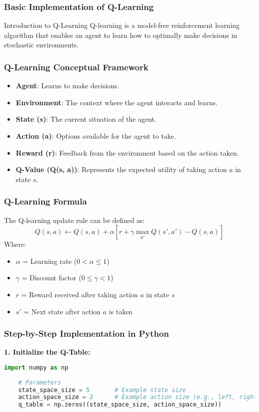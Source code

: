 \documentclass[aspectratio=169]{beamer}
\begin{document}
\begin{frame}
    \frametitle{Basic Implementation of Q-Learning}
    \begin{block}{Introduction to Q-Learning}
        Q-learning is a model-free reinforcement learning algorithm that enables an agent to learn how to optimally make decisions in stochastic environments.
    \end{block}
\end{frame}

\begin{frame}
    \frametitle{Q-Learning Conceptual Framework}
    \begin{itemize}
        \item \textbf{Agent}: Learns to make decisions.
        \item \textbf{Environment}: The context where the agent interacts and learns.
        \item \textbf{State (s)}: The current situation of the agent.
        \item \textbf{Action (a)}: Options available for the agent to take.
        \item \textbf{Reward (r)}: Feedback from the environment based on the action taken.
        \item \textbf{Q-Value (Q(s, a))}: Represents the expected utility of taking action $a$ in state $s$.
    \end{itemize}
\end{frame}

\begin{frame}
    \frametitle{Q-Learning Formula}
    The Q-learning update rule can be defined as:
    \begin{equation}
        Q(s, a) \leftarrow Q(s, a) + \alpha \left[r + \gamma \max_{a'}Q(s', a') - Q(s, a)\right]
    \end{equation}
    Where:
    \begin{itemize}
        \item $ \alpha $ = Learning rate ($0 < \alpha \leq 1$)
        \item $ \gamma $ = Discount factor ($0 \leq \gamma < 1$)
        \item $ r $ = Reward received after taking action $a$ in state $s$
        \item $ s' $ = Next state after action $a$ is taken
    \end{itemize}
\end{frame}

\begin{frame}[fragile]
    \frametitle{Step-by-Step Implementation in Python}
    \textbf{1. Initialize the Q-Table:}
    \begin{lstlisting}[language=Python]
    import numpy as np
    
    # Parameters
    state_space_size = 5       # Example state size
    action_space_size = 2      # Example action size (e.g., left, right)
    q_table = np.zeros((state_space_size, action_space_size))
    \end{lstlisting}
\end{frame}
\end{document}

